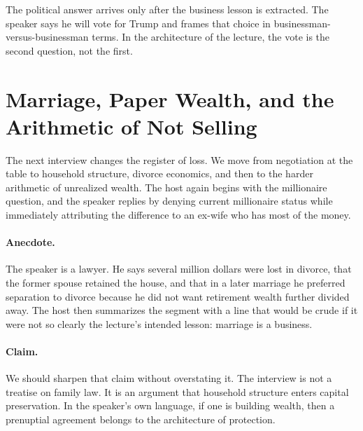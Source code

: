 The political answer arrives only after the business lesson is extracted. The speaker says he will vote for Trump and frames that choice in businessman-versus-businessman terms. In the architecture of the lecture, the vote is the second question, not the first.

\section{Marriage, Paper Wealth, and the Arithmetic of Not Selling}

The next interview changes the register of loss. We move from negotiation at the table to household structure, divorce economics, and then to the harder arithmetic of unrealized wealth. The host again begins with the millionaire question, and the speaker replies by denying current millionaire status while immediately attributing the difference to an ex-wife who has most of the money.

\paragraph{Anecdote.}
The speaker is a lawyer. He says several million dollars were lost in divorce, that the former spouse retained the house, and that in a later marriage he preferred separation to divorce because he did not want retirement wealth further divided away. The host then summarizes the segment with a line that would be crude if it were not so clearly the lecture's intended lesson: marriage is a business.

\paragraph{Claim.}
We should sharpen that claim without overstating it. The interview is not a treatise on family law. It is an argument that household structure enters capital preservation. In the speaker's own language, if one is building wealth, then a prenuptial agreement belongs to the architecture of protection.

